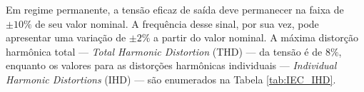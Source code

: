 \documentclass[repeatfields,oneside]{tcc}
\begin{document}

Em regime permanente, a tensão eficaz de saída deve permanecer na faixa de $\pm 10 \%$ de seu valor nominal.
A frequência desse sinal, por sua vez, pode apresentar uma variação de $\pm 2 \%$ a partir do valor nominal.
A máxima distorção harmônica total --- \textit{Total Harmonic Distortion} (THD) --- da tensão é de $8 \%$, enquanto os valores para as distorções harmônicas individuais --- \textit{Individual Harmonic Distortions} (IHD) --- são enumerados na Tabela \ref{tab:IEC_IHD}.
\end{document}
